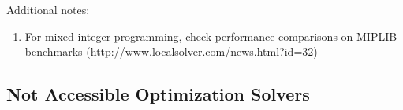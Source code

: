 Additional notes: \vspace{-0.3cm}
\begin{enumerate} \itemsep -4pt
\item For mixed-integer programming, check performance comparisons on {MIPLIB} benchmarks (\url{http://www.localsolver.com/news.html?id=32})
\end{enumerate}
































\subsection{Not Accessible Optimization Solvers}
\label{ssec:NotAccessibleOptimizationSolvers} 

